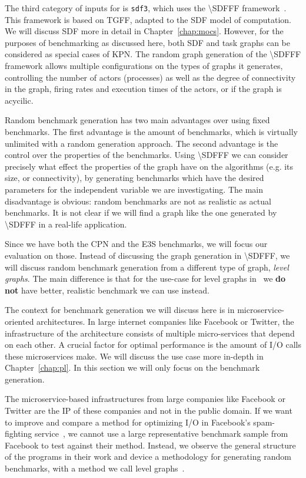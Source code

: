 The third category of inputs for \mocasin is \texttt{sdf3}, which uses the \ac{\SDFFF} framework~\cite{sdf3}.
This framework is based on \ac{TGFF}, adapted to the \ac{SDF} model of computation.
We will discuss \ac{SDF} more in detail in Chapter~\ref{chap:mocs}.
However, for the purposes of benchmarking as discussed here, both \ac{SDF} and task graphs can be considered as special cases of \ac{KPN}.
The random graph generation of the \ac{\SDFFF} framework allows multiple configurations on the types of graphs it generates, controlling the number of actors (processes) as well as the degree of connectivity in the graph, firing rates and execution times of the actors, or if the graph is acycilic.

Random benchmark generation has two main advantages over using fixed benchmarks. The first advantage is the amount of benchmarks, which is virtually unlimited with a random generation approach.
The second advantage is the control over the properties of the benchmarks.
Using \ac{\SDFFF} we can consider precisely what effect the properties of the graph have on the algorithms (e.g. its size, or connectivity), by generating benchmarks which have the desired parameters for the independent variable we are investigating.
The main disadvantage is obvious: random benchmarks are not as realistic as actual benchmarks.
It is not clear if we will find a graph like the one generated by \ac{\SDFFF} in a real-life application.

Since we have both the \ac{CPN} and the \ac{E3S} benchmarks, we will focus our evaluation on those.
Instead of discussing the graph generation in \ac{\SDFFF}, we will discuss random benchmark generation from a different type of graph, \emph{level graphs}\cite{goens_multiprog18}.
The main difference is that for the use-case for level graphs in~\cite{goens_multiprog18} we \textbf{do not} have better, realistic benchmark we can use instead.

The context for benchmark generation we will discuss here is in microservice-oriented architectures.
In large internet companies like Facebook or Twitter, the infrastructure of the architecture consists of multiple micro-services that depend on each other.
A crucial factor for optimal performance is the amount of \ac{I/O} calls these microservices make.
We will discuss the use case more in-depth in Chapter~\ref{chap:pl}. 
In this section we will only focus on the benchmark generation.

The microservice-based infrastructures from large companies like Facebook or Twitter are the \acf{IP} of these companies and not in the public domain.
If we want to improve and compare a method for optimizing \ac{I/O} in Facebook's spam-fighting service~\cite{marlow2014haxl}, we cannot use a large representative benchmark sample from Facebook to test against their method.
Instead, we observe the general structure of the programs in their work and device a methodology for generating random benchmarks, with a method we call level graphs~\cite{goens_multiprog18}.

